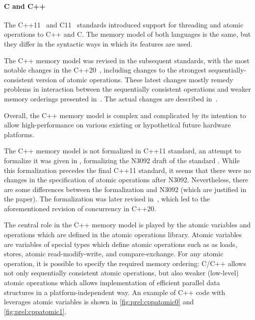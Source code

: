 \paragraph{C and C++}
%
The C++11~\cite{cpp11} and C11~\cite{c11} standards introduced support for
threading and atomic operations to C++ and C.
The memory model of both languages is the same, but they differ in the
syntactic ways in which its features are used.

The C++ memory model was revised in the subsequent standards, with the most
notable changes in the C++20~\cite{cpp20}, including changes to the strongest sequentially-consistent version of atomic operations.
These latest changes mostly remedy problems in interaction between the
sequentially consistent operations and weaker memory orderings presented
in~.
The actual changes are described in~.

Overall, the C++ memory model is complex and complicated by its intention to
allow high-performance on various existing or hypothetical future hardware
platforms.

The C++ memory model is not formalized in C++11 standard, an attempt to
formalize it was given in , formalizing the N3092 draft of the
standard \cite{N3092}.
While this formalization precedes the final C++11 standard, it seems that there were no changes in the specification of atomic operations after N3092.
Nevertheless, there are some differences between the formalization and N3092
(which are justified in the paper).
The formalization was later revised in~, which led to the aforementioned revision of concurrency in C++20.

The central role in the C++ memory model is played by the atomic variables and
operations which are defined in the atomic operations library.
Atomic variables are variables of special types which define atomic operations
such as as loads, stores, atomic read-modify-write, and compare-exchange.
For any atomic operation, it is possible to specify the required memory
ordering: C/C++ allows not only sequentially consistent atomic operations, but
also weaker (low-level) atomic operations which allows implementation of
efficient parallel data structures in a platform-independent way.
An example of C++ code with leverages atomic variables is shown in \autoref{fig:prel:cppatomic0} and \autoref{fig:prel:cppatomic1}.


